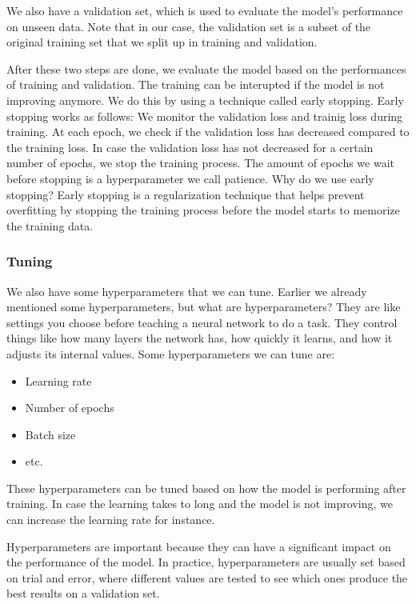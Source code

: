 \documentclass[../paper.tex]{subfiles}
\begin{document}
    We also have a validation set, which is used to evaluate the model's performance on unseen data.
    Note that in our case, the validation set is a subset of the original training set that we split up in training and validation.

    After these two steps are done, we evaluate the model based on the performances of training and validation.
    The training can be interupted if the model is not improving anymore.
    We do this by using a technique called early stopping.
    Early stopping works as follows:
    We monitor the validation loss and trainig loss during training. 
    At each epoch, we check if the validation loss has decreased compared to the training loss.
    In case the validation loss has not decreased for a certain number of epochs, we stop the training process.
    The amount of epochs we wait before stopping is a hyperparameter we call patience.
    Why do we use early stopping?
    Early stopping is a regularization technique that helps prevent overfitting by stopping the training process before the model starts to memorize the training data.\cite{o15}
    \subsubsection{Tuning}
    We also have some hyperparameters that we can tune.
    Earlier we already mentioned some hyperparameters, but what are hyperparameters?
    They are like settings you choose before teaching a neural network to do a task. 
    They control things like how many layers the network has, how quickly it learns, and how it adjusts its internal values.\cite{o16}
    Some hyperparameters we can tune are:
    \begin{itemize}
        \item Learning rate
        \item Number of epochs
        \item Batch size
        \item etc.
    \end{itemize}
    These hyperparameters can be tuned based on how the model is performing after training.
    In case the learning takes to long and the model is not improving, we can increase the learning rate for instance.

    Hyperparameters are important because they can have a significant impact on the performance of the model.
    In practice, hyperparameters are usually set based on trial and error, 
    where different values are tested to see which ones produce the best results on a validation set.
\end{document}
